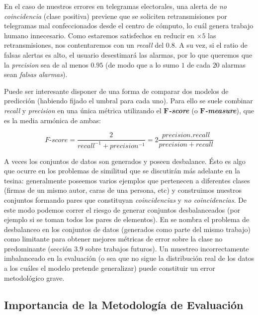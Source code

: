En el caso de nuestros errores en telegramas electorales, una alerta de \textit{no coincidencia} (clase positiva) previene que se soliciten retransmisiones por telegramas mal confeccionados desde el centro de cómputo, lo cuál genera trabajo humano innecesario. Como estaremos satisfechos en reducir en $\times 5$ las retransmisiones, nos contentaremos con un \textit{recall} del $0.8$. A su vez, si el ratio de falsas alertas es alto, el usuario desestimará las alarmas, por lo que queremos que la \textit{precision} sea de al menos $0.95$ (de modo que a lo sumo $1$ de cada $20$ alarmas sean \textit{falsas alarmas}).

Puede ser interesante disponer de una forma de comparar dos modelos de predicción (habiendo fijado el umbral para cada uno). Para ello se suele combinar \textit{recall} y \textit{precision} en una única métrica utilizando el $\boldsymbol{F}$\textbf{\textit{-score}} (o $\boldsymbol{F}$\textbf{\textit{-measure}}), que es la media armónica de ambas:

\begin{equation*}
    F\text{-}score = \frac{2}{recall^{-1} + precision^{-1}} = 2 \frac{precision . recall}{precision + recall}
\end{equation*}

A veces los conjuntos de datos son generados y poseen desbalance. Ésto es algo que ocurre en los problemas de similitud que se discutirán más adelante en la tesina: generalmente poseemos varios ejemplos que pertenecen a diferentes clases (firmas de un mismo autor, caras de una persona, etc) y construimos nuestros conjuntos formando pares que constituyan \textit{coincidencias} y \textit{no coincidencias}. De este modo podemos correr el riesgo de generar conjuntos desbalanceados (por ejemplo si se toman todos los pares de elementos). En \cite{tesis-parodi} se nombra el problema de desbalanceo en los conjuntos de datos (generados como parte del mismo trabajo) como limitante para obtener mejores métricas de error sobre la clase no predominante (sección 3.9 sobre trabajos futuros). Un muestreo incorrectamente imbalanceado en la evaluación (o sea que no sigue la distribución real de los datos a los cuáles el modelo pretende generalizar) puede constituir un error metodológico grave.

\subsection{Importancia de la Metodología de Evaluación}

